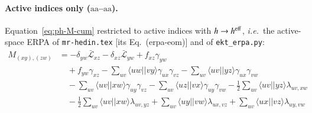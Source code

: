 \documentclass[aip,jcp,reprint,noshowkeys,superscriptaddress]{revtex4-1}
\newcommand{\ie}{\textit{i.e.}}
\newcommand{\saa}{\text{aa}}
\begin{document}
\paragraph*{Active indices only ($\saa$--$\saa$).}
Equation~\eqref{eq:ph-M-cum} restricted to active indices with $h\to h^{\rm eff}$,
\ie\ the active-space ERPA of \texttt{mr-hedin.tex} [its Eq.~(erpa-eom)] and of
\texttt{ekt\_erpa.py}:
\begin{align}
  M_{(xy),(zw)} &= -\delta_{yw}\bar{\mathcal L}_{xz} -\delta_{xz}\bar{\mathcal L}_{yw} +f_{xz}\gamma_{yw} \nonumber\\
  &\quad +f_{yw}\gamma_{xz} -\sum_{uv}\langle uw||vy\rangle\gamma_{ux}\gamma_{vz} -\sum_{uv}\langle uv||yz\rangle\gamma_{ux}\gamma_{vw} \nonumber\\
  &\quad -\sum_{uv}\langle uv||xw\rangle\gamma_{uy}\gamma_{vz} -\sum_{uv}\langle uz||vx\rangle\gamma_{uy}\gamma_{vw} -\tfrac{1}{2}\sum_{uv}\langle uv||yz\rangle\lambda_{uv,xw} \nonumber\\
  &\quad -\tfrac{1}{2}\sum_{uv}\langle uv||xw\rangle\lambda_{uv,yz} +\sum_{uv}\langle uy||vw\rangle\lambda_{ux,vz} +\sum_{uv}\langle ux||vz\rangle\lambda_{uy,vw}
  \label{eq:ph-A-aa-aa}
\end{align}
\end{document}
